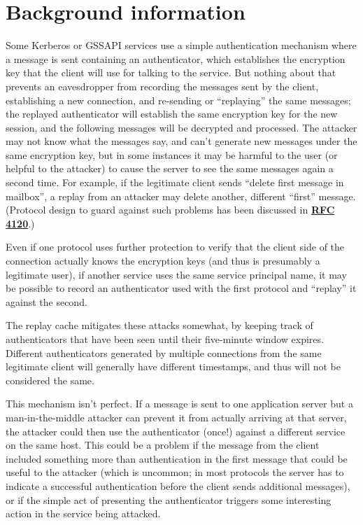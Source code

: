 \documentclass[letterpaper,10pt,english]{sphinxmanual}
\begin{document}
\section{Background information}
\label{basic/rcache_def:background-information}
Some Kerberos or GSSAPI services use a simple authentication mechanism
where a message is sent containing an authenticator, which establishes
the encryption key that the client will use for talking to the
service.  But nothing about that prevents an eavesdropper from
recording the messages sent by the client, establishing a new
connection, and re-sending or ``replaying'' the same messages; the
replayed authenticator will establish the same encryption key for the
new session, and the following messages will be decrypted and
processed.  The attacker may not know what the messages say, and can't
generate new messages under the same encryption key, but in some
instances it may be harmful to the user (or helpful to the attacker)
to cause the server to see the same messages again a second time.  For
example, if the legitimate client sends ``delete first message in
mailbox'', a replay from an attacker may delete another, different
``first'' message.  (Protocol design to guard against such problems has
been discussed in \href{http://tools.ietf.org/html/rfc4120.html\#section-10}{\textbf{RFC 4120}}.)

Even if one protocol uses further protection to verify that the client
side of the connection actually knows the encryption keys (and thus is
presumably a legitimate user), if another service uses the same
service principal name, it may be possible to record an authenticator
used with the first protocol and ``replay'' it against the second.

The replay cache mitigates these attacks somewhat, by keeping track of
authenticators that have been seen until their five-minute window
expires.  Different authenticators generated by multiple connections
from the same legitimate client will generally have different
timestamps, and thus will not be considered the same.

This mechanism isn't perfect.  If a message is sent to one application
server but a man-in-the-middle attacker can prevent it from actually
arriving at that server, the attacker could then use the authenticator
(once!) against a different service on the same host.  This could be a
problem if the message from the client included something more than
authentication in the first message that could be useful to the
attacker (which is uncommon; in most protocols the server has to
indicate a successful authentication before the client sends
additional messages), or if the simple act of presenting the
authenticator triggers some interesting action in the service being
attacked.
\end{document}
